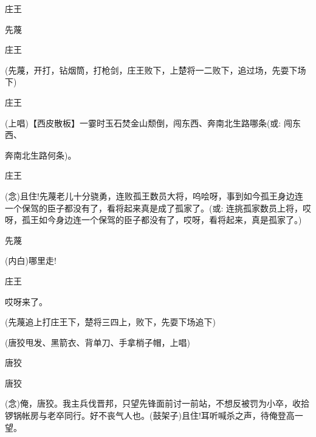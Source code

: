 {庄王\hspace{30pt}~


先蔑\hspace{30pt}~


庄王\hspace{30pt}~


(先蔑\!，开打，钻烟筒，打枪剑，庄王败下，上楚将一二败下，追过场，先耍下场下)

\vspace{5pt}

庄王

(上唱)【{\akai 西皮散板}】一霎时玉石焚金山颓倒，闯东西、奔南北生路哪条({\akai 或}: 闯东西、

奔南北生路何条)。

庄王

({\akai 念})且住!先蔑老儿十分骁勇，连败孤王数员大将，呜哙呀，事到如今孤王身边连一个保驾的臣子都没有了，看将起来真是成了孤家了。({\akai 或}: 连挑孤家数员上将，哎呀，孤王如今身边连一个保驾的臣子都没有了，哎呀，看将起来，真是孤家了。)

先蔑\hspace{30pt}~

({\akai 内}白)哪里走!

庄王\hspace{30pt}~

哎呀来了。

(先蔑追上打庄王下，楚将三四上，败下，先耍下场追下)

\vspace{5pt}

(唐狡甩发、黑箭衣、背单刀、手拿梢子帽，上唱)

唐狡\hspace{30pt}~


唐狡

({\akai 念})俺，唐狡。我主兵伐晋邦，只望先锋面前讨一前站，不想反被罚为小卒，收拾锣锅帐房与老卒同行。好不丧气人也。(鼓架子)且住!耳听喊杀之声，待俺登高一望。

}
